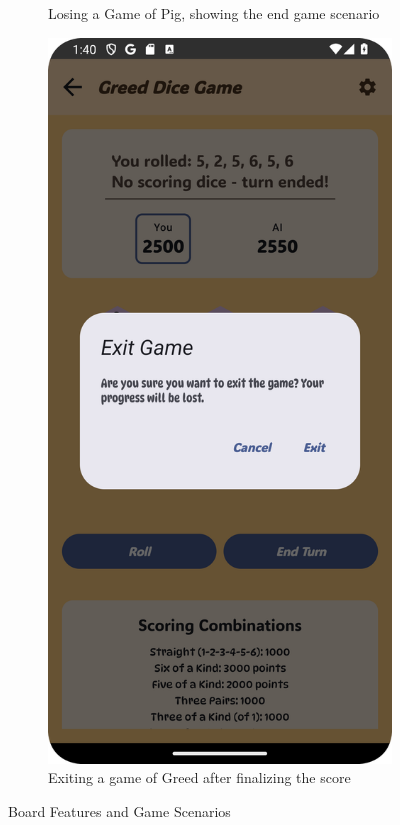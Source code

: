 \begin{figure}[ht!]
\begin{subfigure}[b]{0.27\textwidth}
        \caption{Losing a Game of Pig, showing the end game scenario}
    \end{subfigure}
    \hfill
    \begin{subfigure}[b]{0.27\textwidth}
        \includegraphics[width=\textwidth]{img/greed board2.png}
        \caption{Exiting a game of Greed after finalizing the score}
    \end{subfigure}
    \caption{Board Features and Game Scenarios}
\end{figure}
